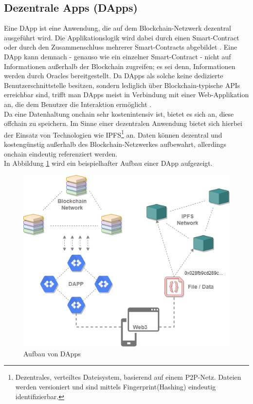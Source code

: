 \subsection{Dezentrale Apps (DApps)}
\label{subsec:fundamentals:dlt:dapps}
Eine \ac{DApp} ist eine Anwendung, die auf dem Blockchain-Netzwerk dezentral ausgeführt wird. Die Applikationslogik wird dabei durch einen Smart-Contract oder durch den Zusammenschluss mehrerer Smart-Contracts abgebildet \cite{dapps2018}. Eine \ac{DApp} kann demnach - genauso wie ein einzelner Smart-Contract - nicht auf Informationen außerhalb der Blockchain zugreifen; es sei denn, Informationen werden durch Oracles bereitgestellt. Da \ac{DApp}s als solche keine dedizierte Benutzerschnittstelle besitzen, sondern lediglich über Blockchain-typische \ac{API}s erreichbar sind, trifft man \ac{DApp}s meist in Verbindung mit einer Web-Applikation an, die dem Benutzer die Interaktion ermöglicht \cite{DAPPS2016}.\\
Da eine Datenhaltung onchain sehr kostenintensiv ist, bietet es sich an, diese offchain zu speichern. Im Sinne einer dezentralen Anwendung bietet sich hierbei der Einsatz von Technologien wie \ac{IPFS}\footnote{Dezentrales, verteiltes Dateisystem, basierend auf einem \ac{P2P}-Netz. Dateien werden versioniert und sind mittels Fingerprint(Hashing) eindeutig identifizierbar.} an. Daten können dezentral und kostengünstig außerhalb des Blockchain-Netzwerkes aufbewahrt, allerdings onchain eindeutig referenziert werden.\\
In Abbildung \ref{fig:chapter02:overview-dapp} wird ein beispielhafter Aufbau einer \ac{DApp} aufgezeigt.

\begin{figure}[h]
 \centering
 \includegraphics[width=1.0\textwidth]{gfx/Overview-DAPP.png}
 \caption{Aufbau von DApps}
 \label{fig:chapter02:overview-dapp}
\end{figure}

